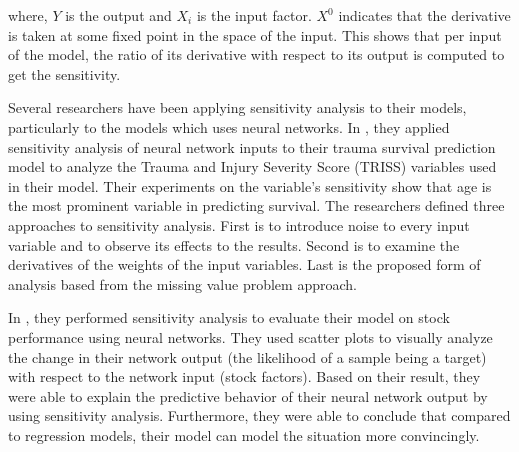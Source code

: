 \noindent where, $Y$ is the output and $X_i$ is the input factor. $X^0$ indicates that the derivative is taken at some fixed point in the space of the input. This shows that per input of the model, the ratio of its derivative with respect to its output is computed to get the sensitivity.

\begin{comment}
\noindent where, the $\partial a$ is the output and the $\partial b$ and $\partial c$ are the inputs of neural networks. This shows that per input of the model, the ratio of its derivative with respect to its output is computed to get the sensitivity.
\end{comment}

Several researchers have been applying sensitivity analysis to their models, particularly to the models which uses neural networks. In , they applied sensitivity analysis of neural network inputs to their trauma survival prediction model to analyze the Trauma and Injury Severity Score (TRISS) variables used in their model. Their experiments on the variable’s sensitivity show that age is the most prominent variable in predicting survival. The researchers defined three approaches to sensitivity analysis. First is to introduce noise to every input variable and to observe its effects to the results. Second is to examine the derivatives of the weights of the input variables. Last is the proposed form of analysis based from the missing value problem approach. 

In , they performed sensitivity analysis to evaluate their model on stock performance using neural networks. They used scatter plots to visually analyze the change in their network output (the likelihood of a sample being a target) with respect to the network input (stock factors). Based on their result, they were able to explain the predictive behavior of their neural network output by using sensitivity analysis. Furthermore, they were able to conclude that compared to regression models, their model can model the situation more convincingly.

